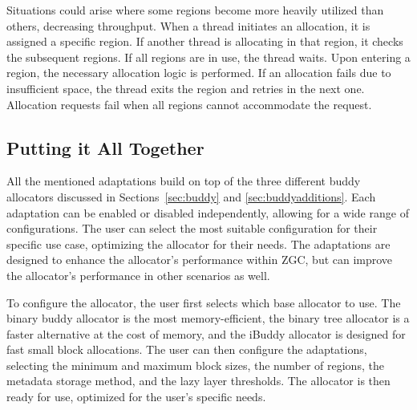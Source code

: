 Situations could arise where some regions become more heavily utilized than others, decreasing throughput. When a thread initiates an allocation, it is assigned a specific region. If another thread is allocating in that region, it checks the subsequent regions. If all regions are in use, the thread waits. Upon entering a region, the necessary allocation logic is performed. If an allocation fails due to insufficient space, the thread exits the region and retries in the next one. Allocation requests fail when all regions cannot accommodate the request.

\subsection{Putting it All Together} \label{sec:adaptationsall}
All the mentioned adaptations build on top of the three different buddy allocators discussed in Sections~\ref{sec:buddy} and \ref{sec:buddyadditions}. Each adaptation can be enabled or disabled independently, allowing for a wide range of configurations. The user can select the most suitable configuration for their specific use case, optimizing the allocator for their needs. The adaptations are designed to enhance the allocator's performance within ZGC, but can improve the allocator's performance in other scenarios as well.

To configure the allocator, the user first selects which base allocator to use. The binary buddy allocator is the most memory-efficient, the binary tree allocator is a faster alternative at the cost of memory, and the iBuddy allocator is designed for fast small block allocations. The user can then configure the adaptations, selecting the minimum and maximum block sizes, the number of regions, the metadata storage method, and the lazy layer thresholds. The allocator is then ready for use, optimized for the user's specific needs.